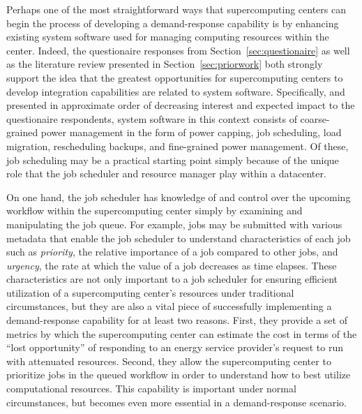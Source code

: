 Perhaps one of the most straightforward ways that supercomputing
centers can begin the process of developing a demand-response
capability is by enhancing existing system software used for managing
computing resources within the center.  Indeed, the questionaire
responses from Section~\ref{sec:questionaire} as well as the literature
review presented in Section~\ref{sec:priorwork} both strongly support the
idea that the greatest opportunities for supercomputing centers to
develop integration capabilities are related to system software.
Specifically, and presented in approximate order of decreasing
interest and expected impact to the questionaire respondents, system
software in this context consists of coarse-grained power management
in the form of power capping, job scheduling, load migration,
rescheduling backups, and fine-grained power management.  Of these,
job scheduling may be a practical starting point simply because of the
unique role that the job scheduler and resource manager play within a
datacenter.

On one hand, the job scheduler has knowledge of and control over the
upcoming workflow within the supercomputing center simply by examining
and manipulating the job queue.  For example, jobs may be submitted
with various metadata that enable the job scheduler to understand
characteristics of each job such as \textit{priority}, the relative
importance of a job compared to other jobs, and \textit{urgency}, the
rate at which the value of a job decreases as time elapses.  These
characteristics are not only important to a job scheduler for ensuring
efficient utilization of a supercomputing center's resources under
traditional circumstances, but they are also a vital piece of
successfully implementing a demand-response capability for at least
two reasons.  First, they provide a set of metrics by which the
supercomputing center can estimate the cost in terms of the ``lost
opportunity'' of responding to an energy service provider's request to
run with attenuated resources.  Second, they allow the supercomputing
center to prioritize jobs in the queued workflow in order to understand
how to best utilize computational resources.  This capability is
important under normal circumstances, but becomes even more essential
in a demand-response scenario.

